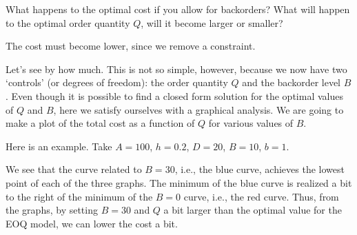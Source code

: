 \begin{question}
  What happens to the optimal cost if you allow for backorders?  What
  will happen to the optimal order quantity $Q$, will it become larger or smaller? 
  \begin{solution}
    The cost must become lower, since we remove a constraint. 

    Let's see by how much.  This is not so simple, however, because we
    now have two `controls' (or degrees of freedom): the order
    quantity $Q$ and the backorder level $B$. Even though it is
    possible to find a closed form solution for the optimal values of
    $Q$ and $B$, here we satisfy ourselves with a graphical analysis.
    We are going to make a plot of the total cost as a function of $Q$
    for various values of $B$.

    Here is an example. Take $A=100$, $h=0.2$, $D=20$, $B=10$, $b=1$.

\begin{center}
\end{center}


We see that the curve related to $B=30$, i.e., the
blue curve, achieves the lowest point of each of the three graphs.
The minimum of the blue curve is realized a bit to the right of the
minimum of the $B=0$ curve, i.e., the red curve.  Thus, from the
graphs, by setting $B=30$ and $Q$ a bit larger than the optimal value
for the EOQ model, we can lower the cost a bit.


\end{solution}
\end{question}
